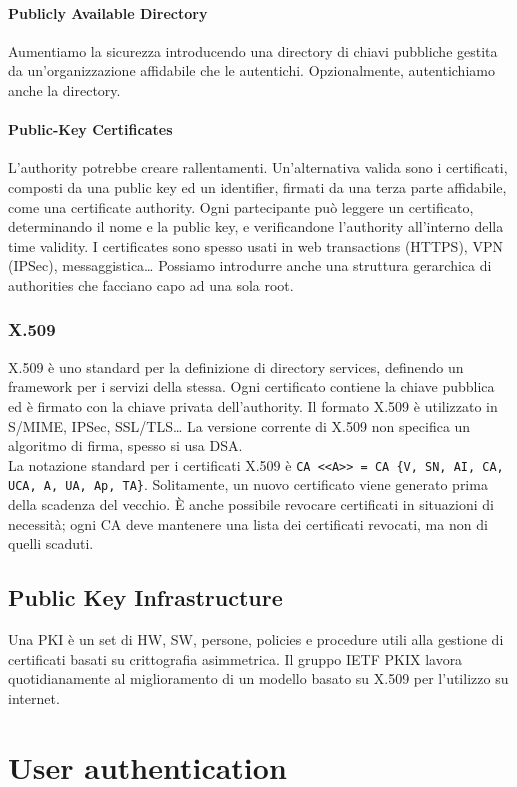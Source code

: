 \documentclass[11pt]{article}
\begin{document}
\paragraph{Publicly Available Directory} Aumentiamo la sicurezza introducendo una directory di chiavi pubbliche gestita da un'organizzazione affidabile che le autentichi. Opzionalmente, autentichiamo anche la directory. 
\paragraph{Public-Key Certificates} L'authority potrebbe creare rallentamenti. Un'alternativa valida sono i certificati, composti da una public key ed un identifier, firmati da una terza parte affidabile, come una certificate authority. Ogni partecipante può leggere un certificato, determinando il nome e la public key, e verificandone l'authority all'interno della time validity.
I certificates sono spesso usati in web transactions (HTTPS), VPN (IPSec), messaggistica\dots
Possiamo introdurre anche una struttura gerarchica di authorities che facciano capo ad una sola root. 
\subsubsection{X.509}
X.509 è uno standard per la definizione di directory services, definendo un framework per i servizi della stessa. Ogni certificato contiene la chiave pubblica ed è firmato con la chiave privata dell'authority. Il formato X.509 è utilizzato in S/MIME, IPSec, SSL/TLS\dots
La versione corrente di X.509 non specifica un algoritmo di firma, spesso si usa DSA.\\La notazione standard per i certificati X.509 è \verb|CA <<A>> = CA {V, SN, AI, CA, UCA, A, UA, Ap, TA}|. Solitamente, un nuovo certificato viene generato prima della scadenza del vecchio. È anche possibile revocare certificati in situazioni di necessità; ogni CA deve mantenere una lista dei certificati revocati, ma non di quelli scaduti. 
\subsection{Public Key Infrastructure}
Una PKI è un set di HW, SW, persone, policies e procedure utili alla gestione di certificati basati su crittografia asimmetrica. Il gruppo IETF PKIX lavora quotidianamente al miglioramento di un modello basato su X.509 per l'utilizzo su internet.

\section{User authentication}
\end{document}
